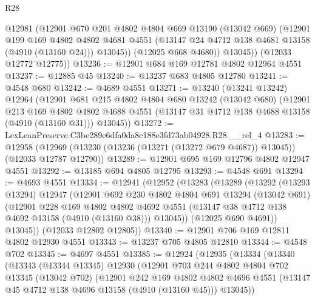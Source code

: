\begin{lexlean}{R28}
\begin{coremodule}
            @12981
            (@12901
              @670
              @201
              @4802
              @4804
              @669
              @13190
              (@13042 @669)
              (@12901
                @199
                @169
                @4802
                @4802
                @4681
                @4551
                (@13147 @24 @4712 @138 @4681 @13158 (@4910 (@13160 @24)))
                @13045))
            (@12025 @668 @4680))
          @13045))
      (@12033 @12772 @12775))
@13236 := @12901 @684 @169 @12781 @4802 @12964 @4551
@13237 := @12885 @45
@13240 := @13237 @683 @4805 @12780
@13241 := @4548 @680
@13242 := @4689 @4551
@13271 := @13240
    (@13241 @13242)
    @12964
    (@12901
      @681
      @215
      @4802
      @4804
      @680
      @13242
      (@13042 @680)
      (@12901
        @213
        @169
        @4802
        @4802
        @4688
        @4551
        (@13147 @31 @4712 @138 @4688 @13158 (@4910 (@13160 @31)))
        @13045))
@13272 := LexLeanPreserve.C3be289e6dfa0da8c188e3fd73ab04928.R28.__rel_4
@13283 := @12958
    (@12969 (@13230 (@13236 (@13271 (@13272 @679 @4687)) @13045)) (@12033 @12787 @12790))
@13289 := @12901 @695 @169 @12796 @4802 @12947 @4551
@13292 := @13185 @694 @4805 @12795
@13293 := @4548 @691
@13294 := @4693 @4551
@13334 := @12941
    (@12952
      (@13283
        (@13289
          (@13292
            (@13293 @13294)
            @12947
            (@12901
              @692
              @230
              @4802
              @4804
              @691
              @13294
              (@13042 @691)
              (@12901
                @228
                @169
                @4802
                @4802
                @4692
                @4551
                (@13147 @38 @4712 @138 @4692 @13158 (@4910 (@13160 @38)))
                @13045))
            (@12025 @690 @4691))
          @13045))
      (@12033 @12802 @12805))
@13340 := @12901 @706 @169 @12811 @4802 @12930 @4551
@13343 := @13237 @705 @4805 @12810
@13344 := @4548 @702
@13345 := @4697 @4551
@13385 := @12924
    (@12935
      (@13334
        (@13340
          (@13343
            (@13344 @13345)
            @12930
            (@12901
              @703
              @244
              @4802
              @4804
              @702
              @13345
              (@13042 @702)
              (@12901
                @242
                @169
                @4802
                @4802
                @4696
                @4551
                (@13147 @45 @4712 @138 @4696 @13158 (@4910 (@13160 @45)))
                @13045))

\end{coremodule}
\end{lexlean}
